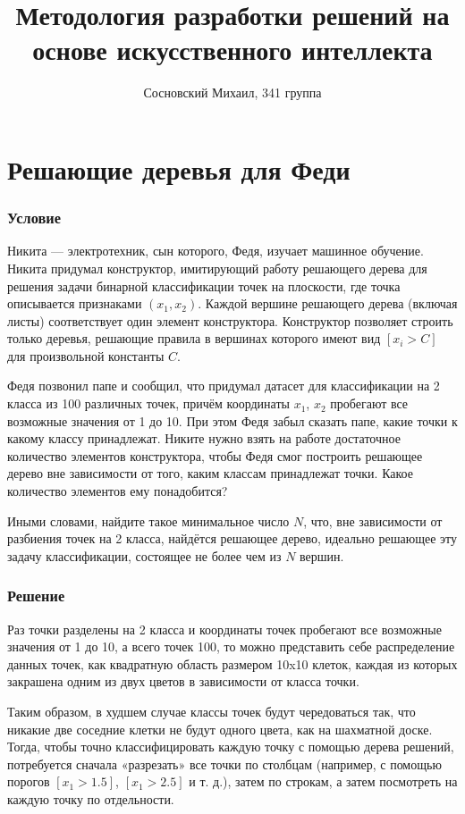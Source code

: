 \documentclass{article}
\title{Методология разработки решений на основе искусственного интеллекта}
\author{Сосновский Михаил, 341 группа}
\date{}
\begin{document}
\maketitle

\section{Решающие деревья для Феди}

\subsubsection*{Условие}

Никита — электротехник, сын которого, Федя, изучает машинное обучение. Никита придумал конструктор, имитирующий работу решающего дерева для решения задачи бинарной классификации точек на плоскости, где точка описывается признаками $(x_1, x_2)$. Каждой вершине решающего дерева (включая листы) соответствует один элемент конструктора. Конструктор позволяет строить только деревья, решающие правила в вершинах которого имеют вид $[x_i > C]$ для произвольной константы $C$.

Федя позвонил папе и сообщил, что придумал датасет для классификации на 2 класса из 100 различных точек, причём координаты $x_1$, $x_2$ пробегают все возможные значения от 1 до 10. При этом Федя забыл сказать папе, какие точки к какому классу принадлежат. Никите нужно взять на работе достаточное количество элементов конструктора, чтобы Федя смог построить решающее дерево вне зависимости от того, каким классам принадлежат точки. Какое количество элементов ему понадобится?

Иными словами, найдите такое минимальное число $N$, что, вне зависимости от разбиения точек на 2 класса, найдётся решающее дерево, идеально решающее эту задачу классификации, состоящее не более чем из $N$ вершин.

\subsubsection*{Решение}

Раз точки разделены на 2 класса и координаты точек пробегают все возможные значения от 1 до 10, а всего точек 100, то можно представить себе распределение данных точек, как квадратную область размером 10x10 клеток, каждая из которых закрашена одним из двух цветов в зависимости от класса точки.

Таким образом, в худшем случае классы точек будут чередоваться так, что никакие две соседние клетки не будут одного цвета, как на шахматной доске. Тогда, чтобы точно классифицировать каждую точку с помощью дерева решений, потребуется сначала «разрезать» все точки по столбцам (например, с помощью порогов $[x_1 > 1.5]$, $[x_1 > 2.5]$ и т. д.), затем по строкам, а затем посмотреть на каждую точку по отдельности.
\end{document}
